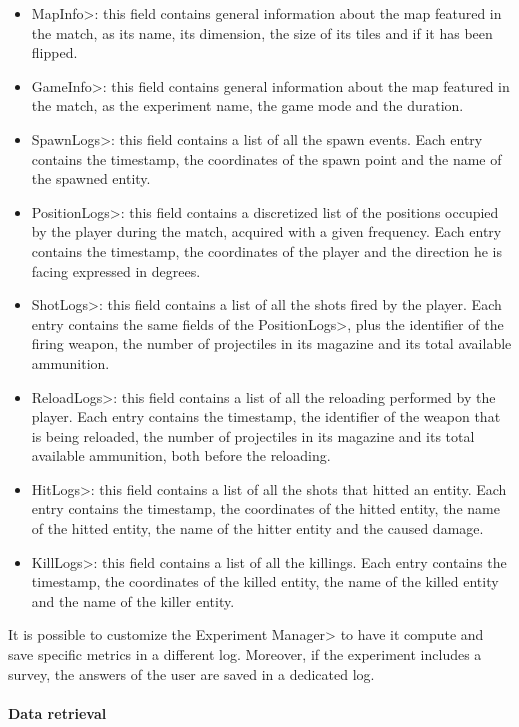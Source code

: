\begin{itemize}
\item \<MapInfo>: this field contains general information about the map featured in the match, as its name, its dimension, the size of its tiles and if it has been flipped.
\item \<GameInfo>: this field contains general information about the map featured in the match, as the experiment name, the game mode and the duration.
\item \<SpawnLogs>: this field contains a list of all the spawn events. Each entry contains the timestamp, the coordinates of the spawn point and the name of the spawned entity.
\item \<PositionLogs>: this field contains a discretized list of the positions occupied by the player during the match, acquired with a given frequency. Each entry contains the timestamp, the coordinates of the player and the direction he is facing expressed in degrees.
\item \<ShotLogs>: this field contains a list of all the shots fired by the player. Each entry contains the same fields of the \<PositionLogs>, plus the identifier of the firing weapon, the number of projectiles in its magazine and its total available ammunition.
\item \<ReloadLogs>: this field contains a list of all the reloading performed by the player. Each entry contains the timestamp, the identifier of the weapon that is being reloaded, the number of projectiles in its magazine and its total available ammunition, both before the reloading.
\item \<HitLogs>: this field contains a list of all the shots that hitted an entity. Each entry contains the timestamp, the coordinates of the hitted entity, the name of the hitted entity, the name of the hitter entity and the caused damage.
\item \<KillLogs>: this field contains a list of all the killings. Each entry contains the timestamp, the coordinates of the killed entity, the name of the killed entity and the name of the killer entity.
\end{itemize}

It is possible to customize the \<Experiment Manager> to have it compute and save specific metrics in a different log. Moreover, if the experiment includes a survey, the answers of the user are saved in a dedicated log.

\paragraph{Data retrieval}

